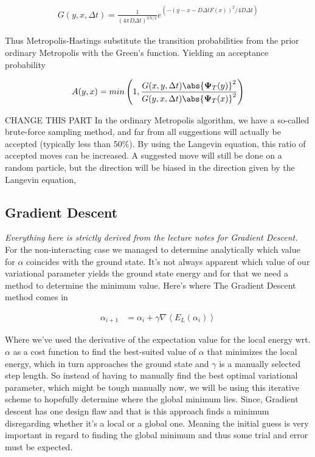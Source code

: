 \begin{align}
    G\left(y,x,\Delta t\right) = \frac{1}{\left( 4\pi D\Delta t \right)^{3N/2}} e^{\left( -\left(y-x-D\Delta t F(x)\right)^2/ 4D\Delta t \right)}
\end{align}


Thus Metropolis-Hastings substitute the transition probabilities from the prior ordinary Metropolis with the Green's function. Yielding an acceptance probability

\begin{align}
    A(y,x) = min\left( 1, \frac{G(x,y,\Delta t)\abs{\mathbf{\Psi}_T(y)}^2}{G(y,x,\Delta t)\abs{\mathbf{\Psi}_T(x)}^2} \right)
\end{align}

{\Large CHANGE THIS PART} In the ordinary Metropolis algorithm, we have a so-called brute-force sampling method, and far from all suggestions will actually be accepted (typically less than 50\%).  By using the Langevin equation, this ratio of accepted moves can be increased. A suggested move will still be done on a random particle, but the direction will be biased in the direction given by the Langevin equation,

\subsection{Gradient Descent}

\textit{Everything here is strictly derived from the lecture notes \cite{Gradient-Descent} for Gradient Descent.} \\

For the non-interacting case we managed to determine analytically which value for $\alpha$ coincides with the ground state. It's not always apparent which value of our variational parameter yields the ground state energy and for that we need a method to determine the minimum value. Here's where The Gradient Descent method comes in

\begin{align}
    \alpha_{i+1} &= \alpha_i + \gamma \nabla \left\langle E_L (\alpha_i) \right\rangle
\end{align}

Where we've used the derivative of the expectation value for the local energy wrt. $\alpha$ as a cost function to find the best-suited value of $\alpha$ that minimizes the local energy, which in turn approaches the ground state and $\gamma$ is a manually selected step length. So instead of having to manually find the best optimal variational parameter, which might be tough manually now, we will be using this iterative scheme to hopefully determine where the global minimum lies. Since, Gradient descent has one design flaw and that is this approach finds a minimum disregarding whether it's a local or a global one. Meaning the initial guess is very important in regard to finding the global minimum and thus some trial and error must be expected.


